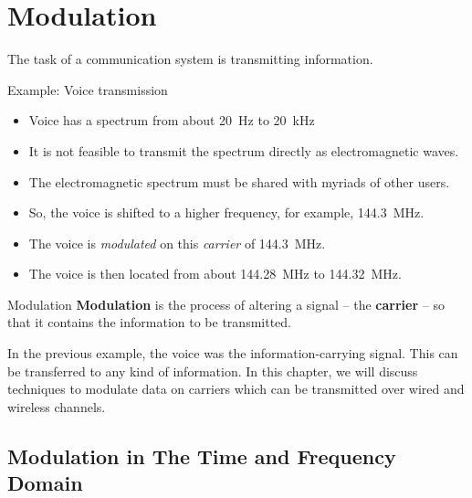 %
%
%

\chapter{Modulation}

\begin{refsection}
	
The task of a communication system is transmitting information.

Example: Voice transmission
\begin{itemize}
	\item Voice has a spectrum from about \SI{20}{Hz} to \SI{20}{kHz}
	\item It is not feasible to transmit the spectrum directly as electromagnetic waves.
	\item The electromagnetic spectrum must be shared with myriads of other users.
	\item So, the voice is shifted to a higher frequency, for example, \SI{144.3}{MHz}.
	\item The voice is \emph{modulated} on this \emph{carrier} of \SI{144.3}{MHz}.
	\item The voice is then located from about \SI{144.28}{MHz} to \SI{144.32}{MHz}.
\end{itemize}

\begin{definition}{Modulation}
	 \textbf{Modulation} is the process of altering a signal -- the  \textbf{carrier} -- so that it contains the information to be transmitted.
\end{definition}

In the previous example, the voice was the information-carrying signal. This can be transferred to any kind of information. In this chapter, we will discuss techniques to modulate data on carriers which can be transmitted over wired and wireless channels.


\section{Modulation in The Time and Frequency Domain}


\end{refsection}
